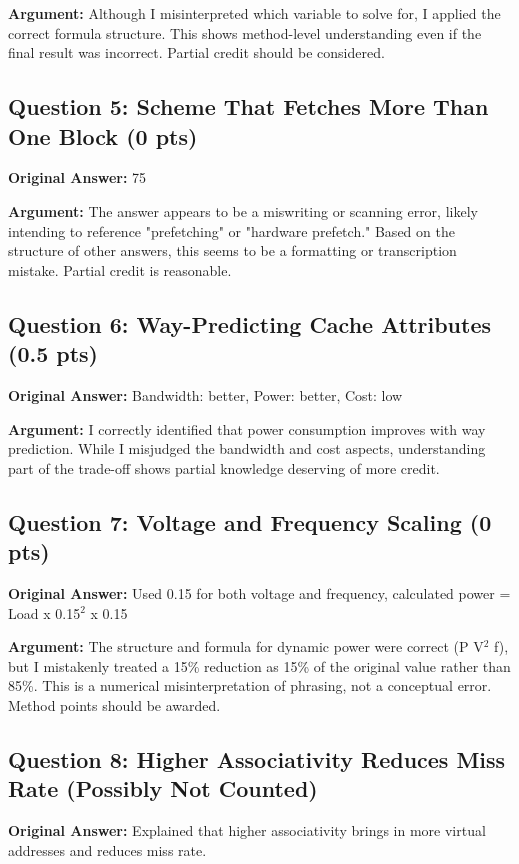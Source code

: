 \documentclass[11pt]{article}
\begin{document}
\textbf{Argument:} Although I misinterpreted which variable to solve for, I applied the correct formula structure. This shows method-level understanding even if the final result was incorrect. Partial credit should be considered.

\subsection*{Question 5: Scheme That Fetches More Than One Block (0 pts)}
\textbf{Original Answer:} 75

\textbf{Argument:} The answer appears to be a miswriting or scanning error, likely intending to reference "prefetching" or "hardware prefetch." Based on the structure of other answers, this seems to be a formatting or transcription mistake. Partial credit is reasonable.

\subsection*{Question 6: Way-Predicting Cache Attributes (0.5 pts)}
\textbf{Original Answer:} Bandwidth: better, Power: better, Cost: low

\textbf{Argument:} I correctly identified that power consumption improves with way prediction. While I misjudged the bandwidth and cost aspects, understanding part of the trade-off shows partial knowledge deserving of more credit.

\subsection*{Question 7: Voltage and Frequency Scaling (0 pts)}
\textbf{Original Answer:} Used 0.15 for both voltage and frequency, calculated power = Load x 0.15$^2$ x 0.15

\textbf{Argument:} The structure and formula for dynamic power were correct (P \propto V$^2$ \cdot f), but I mistakenly treated a 15\% reduction as 15\% of the original value rather than 85\%. This is a numerical misinterpretation of phrasing, not a conceptual error. Method points should be awarded.

\subsection*{Question 8: Higher Associativity Reduces Miss Rate (Possibly Not Counted)}
\textbf{Original Answer:} Explained that higher associativity brings in more virtual addresses and reduces miss rate.
\end{document}
